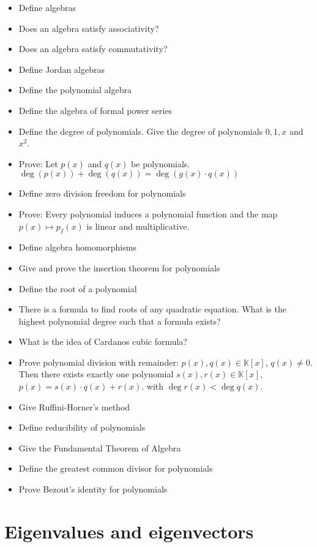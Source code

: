 \documentclass[a4paper]{article}
\begin{document}
\begin{itemize}
  \item Define algebras
  \item Does an algebra satisfy associativity?
  \item Does an algebra satisfy commutativity?
  \item Define Jordan algebras
  \item Define the polynomial algebra
  \item Define the algebra of formal power series
  \item Define the degree of polynomials. Give the degree of polynomials $0, 1, x$ and $x^2$.
  \item Prove: Let $p(x)$ and $q(x)$ be polynomials. $\deg(p(x)) + \deg(q(x)) = \deg(g(x) \cdot q(x))$
  \item Define zero division freedom for polynomials
  \item Prove: Every polynomial induces a polynomial function and the map $p(x) \mapsto p_f(x)$ is linear and multiplicative.
  \item Define algebra homomorphisms
  \item Give and prove the insertion theorem for polynomials
  \item Define the root of a polynomial
  \item There is a formula to find roots of any quadratic equation. What is the highest polynomial degree such that a formula exists?
  \item What is the idea of Cardanos cubic formula?
  \item Prove polynomial division with remainder: $p(x), q(x) \in \mathbb K[x]$, $q(x) \neq 0$. Then there exists exactly one polynomial $s(x), r(x) \in \mathbb K[x]$, $p(x) = s(x) \cdot q(x) + r(x)$.
  with $\deg{r(x)} < \deg{q(x)}$.
  \item Give Ruffini-Horner's method
  \item Define reducibility of polynomials
  \item Give the Fundamental Theorem of Algebra
  \item Define the greatest common divisor for polynomials
  \item Prove Bezout's identity for polynomials
\end{itemize}

\section{Eigenvalues and eigenvectors}
\end{document}

